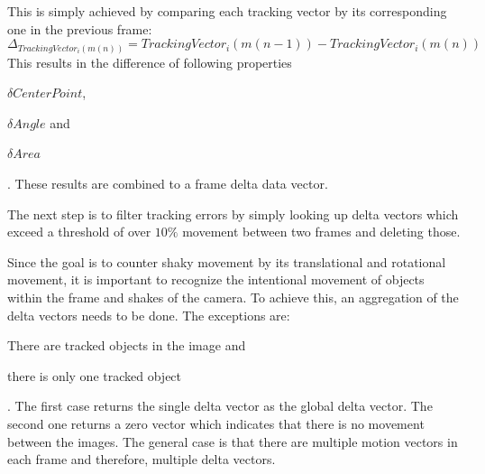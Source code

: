 This is simply achieved by comparing each tracking vector by its corresponding one in the previous frame:
\[\Delta_{TrackingVector_i(m(n))} = TrackingVector_i(m(n-1)) - TrackingVector_i(m(n))\]
This results in the difference of following properties \begin{enumerate*}[label= (\roman*)]
    \item $\delta CenterPoint$, \item $\delta Angle$ and \item $\delta Area$
\end{enumerate*}. These results are combined to a frame delta data vector.

The next step is to filter tracking errors by simply looking up delta vectors which exceed a threshold of over $10\%$ movement between two frames and deleting those.

Since the goal is to counter shaky movement by its translational and rotational movement, it is important to recognize the intentional movement of objects within the frame and shakes of the camera. To achieve this, an aggregation of the delta vectors needs to be done. The exceptions are: \begin{enumerate*}
    \item There are tracked objects in the image and \item there is only one tracked object
\end{enumerate*}. The first case returns the single delta vector as the global delta vector. The second one returns a zero vector which indicates that there is no movement between the images. The general case is that there are multiple motion vectors in each frame and therefore, multiple delta vectors.

